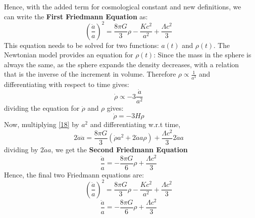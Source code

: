 \documentclass[12pt]{article}
\begin{document}
Hence, with the added term for cosmological constant and new definitions, we can write the \textbf{First Friedmann Equation} as:
\begin{equation}
\left(\frac{\dot{a}}{a}\right)^{2}=\frac{8 \pi G}{3} \rho-\frac{K c^{2}}{a^{2}}+\frac{\Lambda c^{2}}{3}
\label{18}
\end{equation}
This equation needs to be solved for two functions: $a(t)$ and $\rho(t)$. The Newtonian model provides an equation for $\rho(t)$: Since the mass in the sphere is always the same, as the sphere expands the density decreases, with a relation that is the inverse of the increment in volume. Therefore 
$\rho \propto \frac{1}{a^{3}}$ and differentiating  with respect to time gives:
\begin{equation}
\dot{\rho} \propto-3 \frac{\dot{a}}{a^{2}}
\end{equation}
dividing the equation for $\dot{\rho}$ and $\rho$ gives:
\begin{equation}
\dot{\rho}=-3 H \rho
\label{20}
\end{equation}
Now, multiplying \eqref{18} by $a^2$ and differentiating w.r.t time,
\begin{equation*}
2\dot{a}\ddot{a}=\frac{8 \pi G}{3}\left(\dot{\rho}a^{2}+ 2\dot{a}a \rho\right)+\frac{\Lambda c^{2}}{3} 2\dot{a}a
\end{equation*}
dividing by $2\dot{a}a$, we get the \textbf{Second Friedmann Equation} 
\begin{equation}
\frac{\ddot{a}}{a}=-\frac{8 \pi G}{6} \rho+\frac{\Lambda c^{2}}{3}
\end{equation}
Hence, the final two {Friedmann equations} are:
\begin{equation}
\left(\frac{\dot{a}}{a}\right)^{2}=\frac{8 \pi G}{3} \rho-\frac{K c^{2}}{a^{2}}+\frac{\Lambda c^{2}}{3}
\end{equation}
\begin{equation}
\frac{\ddot{a}}{a}=-\frac{8 \pi G}{6} \rho+\frac{\Lambda c^{2}}{3}
\end{equation}
\end{document}
